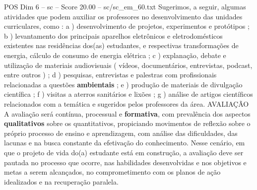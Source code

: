 \begin{textsample}{POS Dim 6 – sc – Score 20.00 – sc/sc\_em\_60.txt}
Sugerimos, a seguir, algumas atividades que podem auxiliar os professores no desenvolvimento das unidades curriculares, como : a ) desenvolvimento de projetos, experimentos e protótipos ; b ) levantamento dos principais aparelhos eletrônicos e eletrodomésticos existentes nas residências dos(as) estudantes, e respectivas transformações de energia, cálculo de consumo de energia elétrica ; c ) explanação, debate e utilização de materiais audiovisuais ( vídeos, documentários, entrevistas, podcast, entre outros ) ; d ) pesquisas, entrevistas e palestras com profissionais relacionadas a questões \textbf{ambientais} ; e ) produção de materiais de divulgação científica ; f ) visitas a aterros sanitários e lixões ; g ) análise de artigos científicos relacionados com a temática e sugeridos pelos professores da área.
AVALIAÇÃO A avaliação será contínua, processual e \textbf{formativa}, com prevalência dos aspectos \textbf{qualitativos} sobre os quantitativos, propiciando movimentos de reflexão sobre o próprio processo de ensino e aprendizagem, com análise das dificuldades, das lacunas e na busca constante da efetivação do conhecimento.
Nesse cenário, em que o projeto de vida do(a) estudante está em construção, a avaliação deve ser pautada no processo que ocorre, nas habilidades desenvolvidas e nos objetivos e metas a serem alcançados, no comprometimento com os planos de ação idealizados e na recuperação paralela.

\end{textsample}
